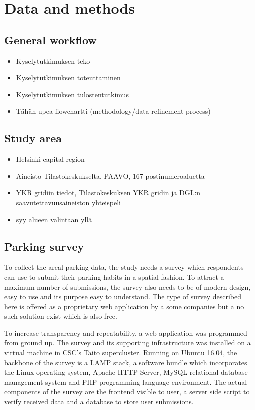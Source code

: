 \section{Data and methods}
\subsection{General workflow}
\justify
\begin{itemize}
    \item Kyselytutkimuksen teko
    \item Kyselytutkimuksen toteuttaminen
    \item Kyselytutkimuksen tulostentutkimus
    \item Tähän upea flowchartti (methodology/data refinement process)
\end{itemize}

\subsection{Study area}
\justify
\begin{itemize}
    \item Helsinki capital region
    \item Aineisto Tilastokeskukselta, PAAVO, 167 postinumeroaluetta
    \item YKR gridiin tiedot, Tilastokeskuksen YKR gridin ja DGL:n saavutettavuusaineiston yhteispeli
    \item syy alueen valintaan yllä
\end{itemize}

\subsection{Parking survey}
\justify
To collect the areal parking data, the study needs a survey which respondents can use to submit their parking habits in a spatial fashion. To attract a maximum number of submissions, the survey also needs to be of modern design, easy to use and its purpose easy to understand. The type of survey described here is offered as a proprietary web application by a some companies but a no such solution exist which is also free. 

To increase transparency and repeatability, a web application was programmed from ground up. The survey and its supporting infrastructure was installed on a virtual machine in CSC's Taito supercluster. Running on Ubuntu 16.04, the backbone of the survey is a LAMP stack, a software bundle which incorporates the Linux operating system, Apache HTTP Server, MySQL relational database management system and PHP programming language environment. The actual components of the survey are the frontend visible to user, a server side script to verify received data and a database to store user submissions. 

